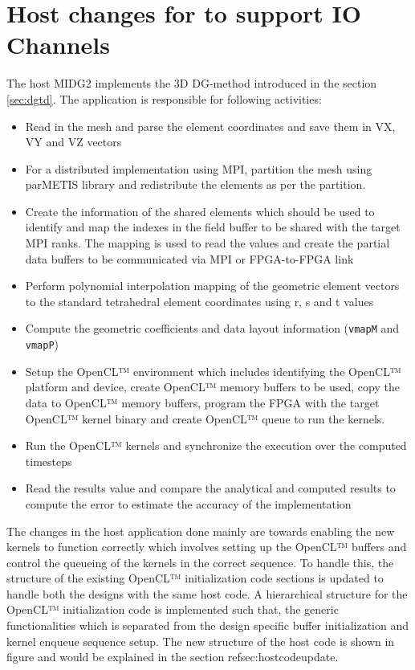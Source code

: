 \section{Host changes for to support IO Channels}

The host MIDG2 implements the 3D DG-method introduced in the section \ref{sec:dgtd}.
The application is responsible for following activities:

\begin{itemize}
    \item Read in the mesh and parse the element coordinates and save them in VX, VY and VZ vectors
    \item For a distributed implementation using MPI, partition the mesh using parMETIS library
    and redistribute the elements as per the partition.
    \item Create the information of the shared elements which should be used to identify and map the
    indexes in the field buffer to be shared with the target MPI ranks. The mapping is used to read the
    values and create the partial data buffers to be communicated via MPI or FPGA-to-FPGA link
    \item Perform polynomial interpolation mapping of the geometric element vectors to the standard tetrahedral
    element coordinates using r, s and t values
    \item Compute the geometric coefficients and data layout information (\texttt{vmapM} and \texttt{vmapP})
    \item Setup the OpenCL™ environment which includes identifying the OpenCL™ platform and device,
    create OpenCL™ memory buffers to be used, copy the data to OpenCL™ memory buffers, program the FPGA with the
    target OpenCL™ kernel binary and create OpenCL™ queue to run the kernels.
    \item Run the OpenCL™ kernels and synchronize the execution over the computed timesteps
    \item Read the results value and compare the analytical and computed results to compute the error
    to estimate the accuracy of the implementation
\end{itemize}

The changes in the host application done mainly are towards enabling the new kernels to function correctly
which involves setting up the OpenCL™ buffers and control the queueing of the kernels in the correct sequence.
To handle this, the structure of the existing OpenCL™ initialization code sections is updated to handle
both the designs with the same host code. A hierarchical structure for the OpenCL™ initialization code
is implemented such that, the generic functionalities which is separated from the design specific buffer
initialization and kernel enqueue sequence setup. The new structure of the host code is shown
in figure  and would be explained in the section ref{sec:hostcodeupdate}.

